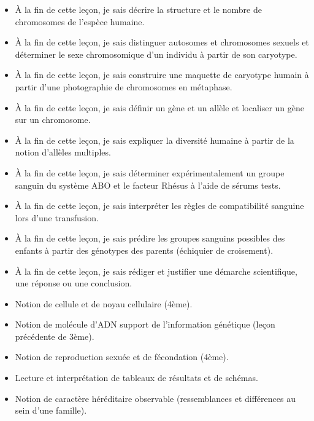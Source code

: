 \documentclass[11pt]{article}
\begin{document}
\begin{objectifs}
\begin{itemize}
\item À la fin de cette leçon, je sais décrire la structure et le nombre de chromosomes de l'espèce humaine.
\item À la fin de cette leçon, je sais distinguer autosomes et chromosomes sexuels et déterminer le sexe chromosomique d'un individu à partir de son caryotype.
\item À la fin de cette leçon, je sais construire une maquette de caryotype humain à partir d'une photographie de chromosomes en métaphase.
\item À la fin de cette leçon, je sais définir un gène et un allèle et localiser un gène sur un chromosome.
\item À la fin de cette leçon, je sais expliquer la diversité humaine à partir de la notion d'allèles multiples.
\item À la fin de cette leçon, je sais déterminer expérimentalement un groupe sanguin du système ABO et le facteur Rhésus à l'aide de sérums tests.
\item À la fin de cette leçon, je sais interpréter les règles de compatibilité sanguine lors d'une transfusion.
\item À la fin de cette leçon, je sais prédire les groupes sanguins possibles des enfants à partir des génotypes des parents (échiquier de croisement).
\item À la fin de cette leçon, je sais rédiger et justifier une démarche scientifique, une réponse ou une conclusion.
\end{itemize}
\end{objectifs}

\begin{prerequis}
\begin{itemize}
\item Notion de cellule et de noyau cellulaire (4ème).
\item Notion de molécule d'ADN support de l'information génétique (leçon précédente de 3ème).
\item Notion de reproduction sexuée et de fécondation (4ème).
\item Lecture et interprétation de tableaux de résultats et de schémas.
\item Notion de caractère héréditaire observable (ressemblances et différences au sein d'une famille).
\end{itemize}
\end{prerequis}
\end{document}
